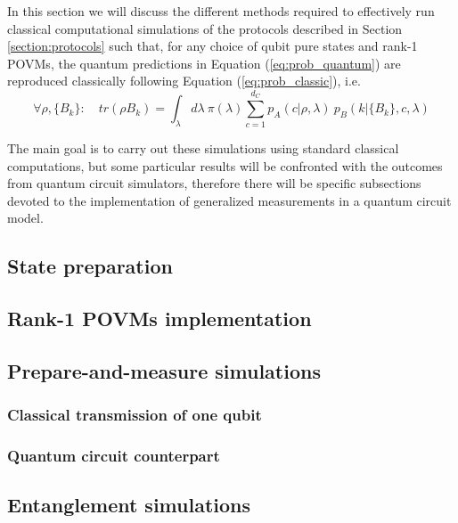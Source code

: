In this section we will discuss the different methods required to effectively run classical computational simulations of the protocols described in Section \ref{section:protocols} such that, for any choice of qubit pure states and rank-1 POVMs, the quantum predictions in Equation (\ref{eq:prob_quantum}) are reproduced classically following Equation (\ref{eq:prob_classic}), i.e.
\begin{equation}
\forall \rho, \{B_{k}\}:\quad tr(\rho B_{k}) = \int_{\lambda} d\lambda\ \pi(\lambda) \sum_{c=1}^{d_C} p_A(c|\rho, \lambda)\ p_B(k|\{B_{k}\}, c, \lambda)    
\end{equation}

The main goal is to carry out these simulations using standard classical computations, but some particular results will be confronted with the outcomes from quantum circuit simulators, therefore there will be specific subsections devoted to the implementation of generalized measurements in a quantum circuit model. 
\subsection{State preparation}

\subsection{Rank-1 POVMs implementation}

\subsection{Prepare-and-measure simulations}
\subsubsection{Classical transmission of one qubit}

\subsubsection{Quantum circuit counterpart}

\subsection{Entanglement simulations}
